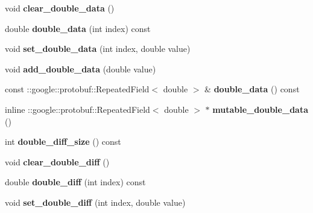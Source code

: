 \begin{DoxyCompactItemize}
void {\bfseries clear\+\_\+double\+\_\+data} ()
\item 
\mbox{\label{classcaffe_1_1_blob_proto_ada7d284bd39e76a0945e2652796ae6db}} 
double {\bfseries double\+\_\+data} (int index) const
\item 
\mbox{\label{classcaffe_1_1_blob_proto_ab2f6384a20a562b7b4fc0fc6dbe934f7}} 
void {\bfseries set\+\_\+double\+\_\+data} (int index, double value)
\item 
\mbox{\label{classcaffe_1_1_blob_proto_aa0005f45e1560360963fc4b1c5e4dddd}} 
void {\bfseries add\+\_\+double\+\_\+data} (double value)
\item 
\mbox{\label{classcaffe_1_1_blob_proto_aeaf742a5f97c89d3d553e81519f4e42b}} 
const \+::google\+::protobuf\+::\+Repeated\+Field$<$ double $>$ \& {\bfseries double\+\_\+data} () const
\item 
\mbox{\label{classcaffe_1_1_blob_proto_a4135305bf9084d7afad7e927c641abc9}} 
inline \+::google\+::protobuf\+::\+Repeated\+Field$<$ double $>$ $\ast$ {\bfseries mutable\+\_\+double\+\_\+data} ()
\item 
\mbox{\label{classcaffe_1_1_blob_proto_ac96a7bc254eb5f25af0af1bac469a214}} 
int {\bfseries double\+\_\+diff\+\_\+size} () const
\item 
\mbox{\label{classcaffe_1_1_blob_proto_a340f3c671d69448a331825a42d01286c}} 
void {\bfseries clear\+\_\+double\+\_\+diff} ()
\item 
\mbox{\label{classcaffe_1_1_blob_proto_a9ac8514e3f0512b9dfcce06049240160}} 
double {\bfseries double\+\_\+diff} (int index) const
\item 
\mbox{\label{classcaffe_1_1_blob_proto_aceafec56d8d227207509bc3d03067eea}} 
void {\bfseries set\+\_\+double\+\_\+diff} (int index, double value)
\item 
\mbox{\label{classcaffe_1_1_blob_proto_a0ae3e281d7a3d47e12eaa4ad8a7925e4}} 

\end{DoxyCompactItemize}
